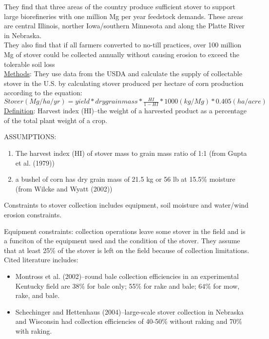 \documentclass{article}\usepackage[]{graphicx}\usepackage[]{color}
\begin{document}
They find that three areas of the country produce sufficient stover to support large biorefineries with one million Mg per year feedstock demands.  These areas are central Illinois, norther Iowa/southern Minnesota and along the Platte River in Nebraska. \\

They also find that if all farmers converted to no-till practices, over 100 million Mg of stover could be collected annually without causing erosion to exceed the tolerable soil loss \\

\underline{Methods}: They use data from the USDA and calculate the supply of collectable stover in the U.S. by calculating stover produced per hectare of corn production according to the equation: \\

$Stover(Mg/ha/yr) = yield*dry grain mass* \frac{HI}{1-HI}*1000(kg/Mg)*0.405(ha/acre)$ \\

\underline{Definition}: Harvest index (HI)--the weight of a harvested product as a percentage of the total plant weight of a crop.

ASSUMPTIONS: 
\begin{enumerate}
\item The harvest index (HI) of stover mass to grain mass ratio of 1:1 (from Gupta et al. (1979))
\item a bushel of corn has dry grain mass of 21.5 kg or 56 lb at 15.5\% moisture (from Wilcke and Wyatt (2002))
\end{enumerate}

Constraints to stover collection includes equipment, soil moisture and water/wind erosion constraints.

Equipment constraints: collection operations leave some stover in the field and is a funciton of the equipment used and the condition of the stover.  They assume that at least 25\% of the stover is left on the field because of collection limitations.  Cited literature includes:

\begin{itemize}
\item Montross et al. (2002)--round bale collection efficiencies in an experimental Kentucky field are 38\% for bale only; 55\% for rake and bale; 64\% for mow, rake, and bale.
\item Schechinger and Hettenhaus (2004)--large-scale stover collection in Nebraska and Wisconsin had collection efficiencies of 40-50\% without raking and 70\% with raking.
\end{itemize}
\end{document}
